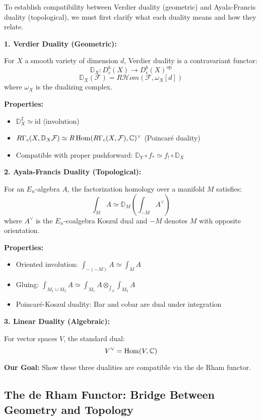 To establish compatibility between Verdier duality (geometric) and Ayala-Francis duality (topological), we must first clarify what each duality means and how they relate.

\begin{definition}\label{def:three-dualities}

\textbf{1. Verdier Duality (Geometric):}

For $X$ a smooth variety of dimension $d$, Verdier duality is a contravariant functor:
$$\mathbb{D}_X: D^b_c(X) \to D^b_c(X)^{\text{op}}$$
$$\mathbb{D}_X(\mathcal{F}) = R\mathcal{H}om(\mathcal{F}, \omega_X[d])$$
where $\omega_X$ is the dualizing complex.

\textbf{Properties:}
\begin{itemize}
\item $\mathbb{D}_X^2 \simeq \text{id}$ (involution)
\item $R\Gamma_c(X, \mathbb{D}_X \mathcal{F}) \simeq R\operatorname{Hom}(R\Gamma_c(X, \mathcal{F}), \mathbb{C})^\vee$ (Poincaré duality)
\item Compatible with proper pushforward: $\mathbb{D}_Y \circ f_* \simeq f_! \circ \mathbb{D}_X$
\end{itemize}

\textbf{2. Ayala-Francis Duality (Topological):}

For an $E_n$-algebra $A$, the factorization homology over a manifold $M$ satisfies:
$$\int_M A \simeq \mathbb{D}_M\left(\int_{-M} A^\vee\right)$$
where $A^\vee$ is the $E_n$-coalgebra Koszul dual and $-M$ denotes $M$ with opposite orientation.

\textbf{Properties:}
\begin{itemize}
\item Oriented involution: $\int_{-(-M)} A \simeq \int_M A$
\item Gluing: $\int_{M_1 \cup M_2} A \simeq \int_{M_1} A \otimes_{\int_{\partial}} \int_{M_2} A$
\item Poincaré-Koszul duality: Bar and cobar are dual under integration
\end{itemize}

\textbf{3. Linear Duality (Algebraic):}

For vector spaces $V$, the standard dual:
$$V^\vee = \operatorname{Hom}(V, \mathbb{C})$$

\textbf{Our Goal:} Show these three dualities are compatible via the de Rham functor.
\end{definition}

\subsection{The de Rham Functor: Bridge Between Geometry and Topology}
\label{subsec:de-rham-functor}

